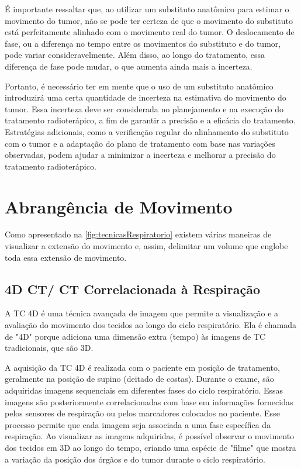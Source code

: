 \documentclass[11pt,a4paper]{article}
\begin{document}
	É importante ressaltar que, ao utilizar um substituto anatômico para estimar o movimento do tumor, não se pode ter certeza de que o movimento do substituto está perfeitamente alinhado com o movimento real do tumor. O deslocamento de fase, ou a diferença no tempo entre os movimentos do substituto e do tumor, pode variar consideravelmente. Além disso, ao longo do tratamento, essa diferença de fase pode mudar, o que aumenta ainda mais a incerteza.

	Portanto, é necessário ter em mente que o uso de um substituto anatômico introduzirá uma certa quantidade de incerteza na estimativa do movimento do tumor. Essa incerteza deve ser considerada no planejamento e na execução do tratamento radioterápico, a fim de garantir a precisão e a eficácia do tratamento. Estratégias adicionais, como a verificação regular do alinhamento do substituto com o tumor e a adaptação do plano de tratamento com base nas variações observadas, podem ajudar a minimizar a incerteza e melhorar a precisão do tratamento radioterápico.

\section{Abrangência de Movimento}

	Como apresentado na \ref{fig:tecnicasRespiratorio} existem várias maneiras de visualizar a extensão do movimento e, assim, delimitar um volume que englobe toda essa extensão de movimento.




\subsection*{4D CT/ CT Correlacionada à Respiração}

	A TC 4D é uma técnica avançada de imagem que permite a visualização e a avaliação do movimento dos tecidos ao longo do ciclo respiratório. Ela é chamada de "4D" porque adiciona uma dimensão extra (tempo) às imagens de TC tradicionais, que são 3D.

	A aquisição da TC 4D é realizada com o paciente em posição de tratamento, geralmente na posição de supino (deitado de costas). Durante o exame, são adquiridas imagens sequenciais em diferentes fases do ciclo respiratório. Essas imagens são posteriormente correlacionadas com base em informações fornecidas pelos sensores de respiração ou pelos marcadores colocados no paciente. Esse processo permite que cada imagem seja associada a uma fase específica da respiração. Ao visualizar as imagens adquiridas, é possível observar o movimento dos tecidos em 3D ao longo do tempo, criando uma espécie de "filme" que mostra a variação da posição dos órgãos e do tumor durante o ciclo respiratório.
\end{document}
